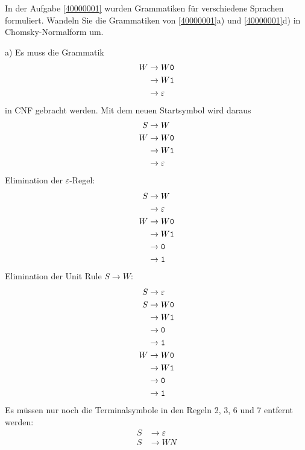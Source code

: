 In der Aufgabe \ref{40000001} wurden Grammatiken für verschiedene
Sprachen formuliert.
Wandeln Sie die Grammatiken von \ref{40000001}a) und \ref{40000001}d) in
Chomsky-Normalform um.


\begin{loesung}
\begin{teilaufgaben}
\item[a)] Es muss die Grammatik
\begin{align*}
W&\rightarrow W{\tt 0}\\
 &\rightarrow W{\tt 1}\\
 &\rightarrow\varepsilon
\end{align*}
in CNF gebracht werden. Mit dem neuen Startsymbol wird daraus
\begin{align*}
S&\rightarrow W\\
W&\rightarrow W{\tt 0}\\
 &\rightarrow W{\tt 1}\\
 &\rightarrow\varepsilon
\end{align*}
Elimination der $\varepsilon$-Regel:
\begin{align*}
S&\rightarrow W\\
 &\rightarrow \varepsilon\\
W&\rightarrow W{\tt 0}\\
 &\rightarrow W{\tt 1}\\
 &\rightarrow {\tt 0}\\
 &\rightarrow {\tt 1}\\
\end{align*}
Elimination der Unit Rule $S\to W$:
\begin{align*}
S&\rightarrow \varepsilon\\
S&\rightarrow W{\tt 0}\\
 &\rightarrow W{\tt 1}\\
 &\rightarrow {\tt 0}\\
 &\rightarrow {\tt 1}\\
W&\rightarrow W{\tt 0}\\
 &\rightarrow W{\tt 1}\\
 &\rightarrow {\tt 0}\\
 &\rightarrow {\tt 1}\\
\end{align*}
Es müssen nur noch die Terminalsymbole in den Regeln 2, 3, 6 und 7
entfernt werden:
\begin{align*}
S&\rightarrow \varepsilon\\
S&\rightarrow WN\\

\end{align*}
\end{teilaufgaben}
\end{loesung}
